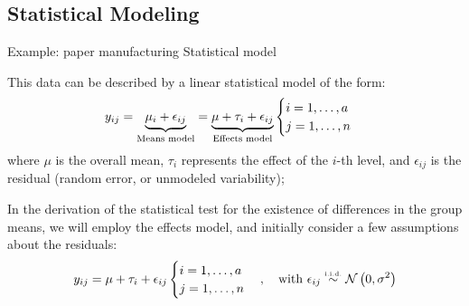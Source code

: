 \subsection{Statistical Modeling}
\begin{frame}
{Example: paper manufacturing}
{Statistical model}

This data can be described by a linear statistical model of the form:
\begin{equation*}
y_{ij} = \underbrace{\mu_i + \epsilon_{ij}}_{\mbox{\scriptsize Means model}} = \underbrace{\mu + \tau_i + \epsilon_{ij}}_{\mbox{\scriptsize Effects model}}\begin{cases}i=1,\ldots,a\\j=1,\ldots,n\end{cases}
\end{equation*}
where $\mu$ is the overall mean, $\tau_i$ represents the effect of the $i$-th level, and $\epsilon_{ij}$ is the residual (random error, or unmodeled variability);\bigskip

In the derivation of the statistical test for the existence of differences in the group means, we will employ the effects model, and initially consider a few assumptions about the residuals:
\begin{equation*}
y_{ij} = \mu + \tau_i + \epsilon_{ij}\begin{cases}i=1,\ldots,a\\j=1,\ldots,n\end{cases},\ \ \ \mbox{with }\epsilon_{ij} \overset{\mbox{\tiny i.i.d.}}{\sim}\mathcal{N}\left(0,\sigma^2\right)
\end{equation*}
\end{frame}



